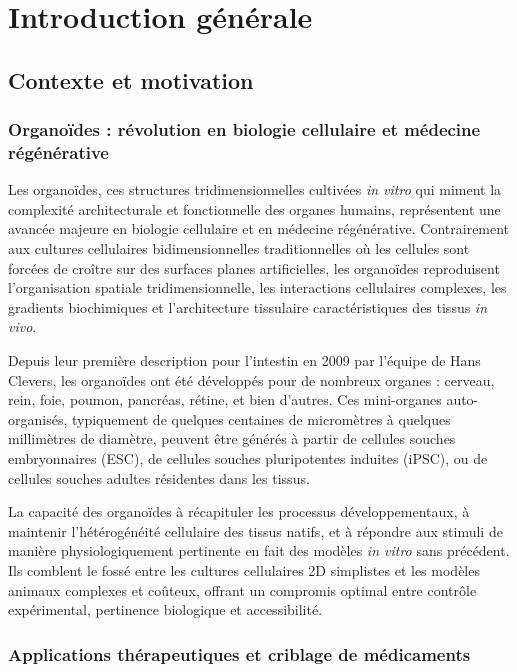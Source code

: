 
\chapter{Introduction générale}

\section{Contexte et motivation}

\subsection{Organoïdes : révolution en biologie cellulaire et médecine régénérative}

Les organoïdes, ces structures tridimensionnelles cultivées \textit{in vitro} qui miment la complexité architecturale et fonctionnelle des organes humains, représentent une avancée majeure en biologie cellulaire et en médecine régénérative. Contrairement aux cultures cellulaires bidimensionnelles traditionnelles où les cellules sont forcées de croître sur des surfaces planes artificielles, les organoïdes reproduisent l'organisation spatiale tridimensionnelle, les interactions cellulaires complexes, les gradients biochimiques et l'architecture tissulaire caractéristiques des tissus \textit{in vivo}.

Depuis leur première description pour l'intestin en 2009 par l'équipe de Hans Clevers, les organoïdes ont été développés pour de nombreux organes : cerveau, rein, foie, poumon, pancréas, rétine, et bien d'autres. Ces mini-organes auto-organisés, typiquement de quelques centaines de micromètres à quelques millimètres de diamètre, peuvent être générés à partir de cellules souches embryonnaires (ESC), de cellules souches pluripotentes induites (iPSC), ou de cellules souches adultes résidentes dans les tissus.

La capacité des organoïdes à récapituler les processus développementaux, à maintenir l'hétérogénéité cellulaire des tissus natifs, et à répondre aux stimuli de manière physiologiquement pertinente en fait des modèles \textit{in vitro} sans précédent. Ils comblent le fossé entre les cultures cellulaires 2D simplistes et les modèles animaux complexes et coûteux, offrant un compromis optimal entre contrôle expérimental, pertinence biologique et accessibilité.

\subsection{Applications thérapeutiques et criblage de médicaments}

